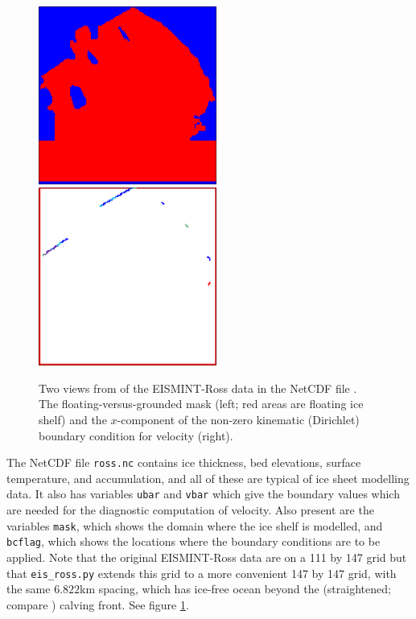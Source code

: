 \documentclass[11pt,final]{amsart}
\begin{document}
\begin{figure}[ht]
\includegraphics[height=2.3in,keepaspectratio=true]{figs/rossmask} \qquad \includegraphics[height=2.3in,keepaspectratio=true]{figs/rossubar}
\caption{Two views from  of the EISMINT-Ross data in the NetCDF file .  The floating-versus-grounded mask (left; red areas are floating ice shelf) and the $x$-component of the non-zero kinematic (Dirichlet) boundary condition for velocity (right).}
\label{fig:rossmaskubar}
\end{figure}

The NetCDF file \verb|ross.nc| contains ice thickness, bed elevations, surface temperature, and accumulation, and all of these are typical of ice sheet modelling data.  It also has variables \verb|ubar| and \verb|vbar| which give the boundary values which are needed for the diagnostic computation of velocity.  Also present are the variables \verb|mask|, which shows the domain where the ice shelf is modelled, and \verb|bcflag|, which shows the locations where the boundary conditions are to be applied.  Note that the original EISMINT-Ross data are on a 111 by 147 grid but that \verb|eis_ross.py| extends this grid to a more convenient 147 by 147 grid, with the same $6.822$km spacing, which has ice-free ocean beyond the (straightened; compare \cite{MacAyealetal}) calving front.  See figure \ref{fig:rossmaskubar}.
\end{document}

